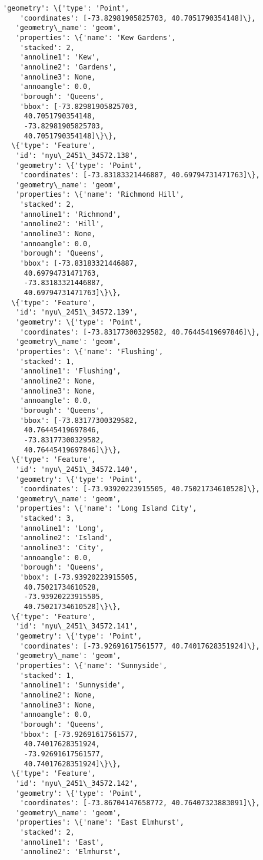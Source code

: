 \documentclass[11pt]{article}
\begin{document}
\begin{tcolorbox}[breakable, size=fbox, boxrule=.5pt, pad at break*=1mm, opacityfill=0]
\begin{Verbatim}[commandchars=\\\{\}]
   'geometry': \{'type': 'Point',
    'coordinates': [-73.82981905825703, 40.7051790354148]\},
   'geometry\_name': 'geom',
   'properties': \{'name': 'Kew Gardens',
    'stacked': 2,
    'annoline1': 'Kew',
    'annoline2': 'Gardens',
    'annoline3': None,
    'annoangle': 0.0,
    'borough': 'Queens',
    'bbox': [-73.82981905825703,
     40.7051790354148,
     -73.82981905825703,
     40.7051790354148]\}\},
  \{'type': 'Feature',
   'id': 'nyu\_2451\_34572.138',
   'geometry': \{'type': 'Point',
    'coordinates': [-73.83183321446887, 40.69794731471763]\},
   'geometry\_name': 'geom',
   'properties': \{'name': 'Richmond Hill',
    'stacked': 2,
    'annoline1': 'Richmond',
    'annoline2': 'Hill',
    'annoline3': None,
    'annoangle': 0.0,
    'borough': 'Queens',
    'bbox': [-73.83183321446887,
     40.69794731471763,
     -73.83183321446887,
     40.69794731471763]\}\},
  \{'type': 'Feature',
   'id': 'nyu\_2451\_34572.139',
   'geometry': \{'type': 'Point',
    'coordinates': [-73.83177300329582, 40.76445419697846]\},
   'geometry\_name': 'geom',
   'properties': \{'name': 'Flushing',
    'stacked': 1,
    'annoline1': 'Flushing',
    'annoline2': None,
    'annoline3': None,
    'annoangle': 0.0,
    'borough': 'Queens',
    'bbox': [-73.83177300329582,
     40.76445419697846,
     -73.83177300329582,
     40.76445419697846]\}\},
  \{'type': 'Feature',
   'id': 'nyu\_2451\_34572.140',
   'geometry': \{'type': 'Point',
    'coordinates': [-73.93920223915505, 40.75021734610528]\},
   'geometry\_name': 'geom',
   'properties': \{'name': 'Long Island City',
    'stacked': 3,
    'annoline1': 'Long',
    'annoline2': 'Island',
    'annoline3': 'City',
    'annoangle': 0.0,
    'borough': 'Queens',
    'bbox': [-73.93920223915505,
     40.75021734610528,
     -73.93920223915505,
     40.75021734610528]\}\},
  \{'type': 'Feature',
   'id': 'nyu\_2451\_34572.141',
   'geometry': \{'type': 'Point',
    'coordinates': [-73.92691617561577, 40.74017628351924]\},
   'geometry\_name': 'geom',
   'properties': \{'name': 'Sunnyside',
    'stacked': 1,
    'annoline1': 'Sunnyside',
    'annoline2': None,
    'annoline3': None,
    'annoangle': 0.0,
    'borough': 'Queens',
    'bbox': [-73.92691617561577,
     40.74017628351924,
     -73.92691617561577,
     40.74017628351924]\}\},
  \{'type': 'Feature',
   'id': 'nyu\_2451\_34572.142',
   'geometry': \{'type': 'Point',
    'coordinates': [-73.86704147658772, 40.76407323883091]\},
   'geometry\_name': 'geom',
   'properties': \{'name': 'East Elmhurst',
    'stacked': 2,
    'annoline1': 'East',
    'annoline2': 'Elmhurst',

\end{Verbatim}
\end{tcolorbox}
\end{document}
